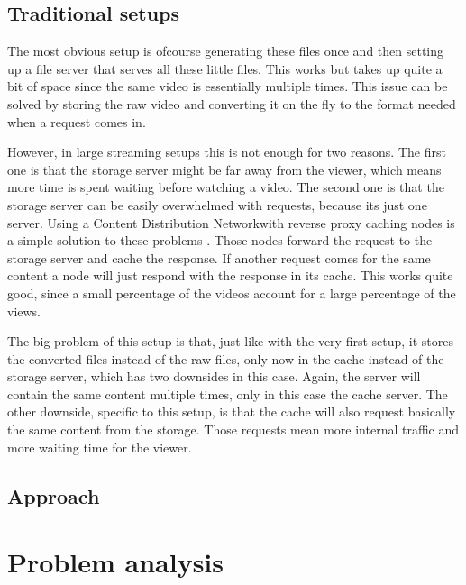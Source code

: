 \documentclass[twoside,openright]{uva-bachelor-thesis}
\begin{document}
\section{Traditional setups}
The most obvious setup is ofcourse generating these files once and then setting
up a file server that serves all these little files. This works but takes up
quite a bit of space since the same video is essentially multiple
times. This issue can be solved by storing the raw video and converting it on
the fly to the format needed when a request comes in.

However, in large streaming setups this is not enough for two reasons. The first
one is that the storage server might be far away from the viewer, which means
more time is spent waiting before watching a video. The second one is that the
storage server can be easily overwhelmed with requests, because its just one
server. Using a Content Distribution
Networkwith reverse proxy caching nodes is a simple solution to these problems
\autocites{cdns}{revproxy}.  Those nodes forward the request to the storage
server and cache the response. If another request comes for the same content a
node will just respond with the response in its cache. This works quite good,
since a small percentage of the videos account for a large percentage of the
views.

The big problem of this setup is that, just like with the very first setup, it
stores the converted files instead of the raw files, only now in the cache
instead of the storage server, which has two downsides in this case. Again, the
server will contain the same content multiple times, only in this case the cache
server. The other downside, specific to this setup, is that the cache will also
request basically the same content from the storage. Those requests mean more
internal traffic and more waiting time for the viewer.

\section{Approach}






\chapter{Problem analysis}
\end{document}
